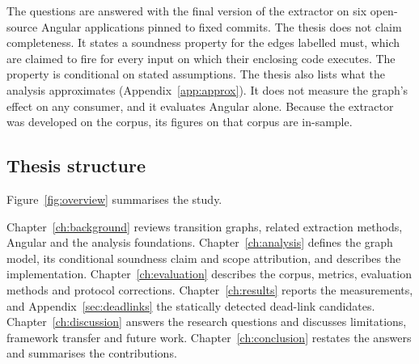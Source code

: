 The questions are answered with the final version of the extractor on six open-source Angular
applications pinned to fixed commits. The thesis does not claim
completeness. It states a soundness property for the edges labelled must, which are claimed to
fire for every input on which their enclosing code executes. The property is conditional on stated
assumptions. The thesis also lists what the analysis approximates
(Appendix~\ref{app:approx}). It does not measure the graph's effect on any consumer, and it
evaluates Angular alone. Because the extractor was developed on the corpus, its figures on that
corpus are in-sample.

\subsection{Thesis structure}

Figure~\ref{fig:overview} summarises the study.



Chapter~\ref{ch:background} reviews transition graphs, related extraction methods, Angular and
the analysis foundations. Chapter~\ref{ch:analysis} defines the graph model, its conditional
soundness claim and scope attribution, and describes the implementation. Chapter~\ref{ch:evaluation} describes the corpus,
metrics, evaluation methods and protocol corrections. Chapter~\ref{ch:results} reports the measurements, and
Appendix~\ref{sec:deadlinks} the statically detected dead-link candidates. Chapter~\ref{ch:discussion} answers the research
questions and discusses limitations, framework transfer and future work.
Chapter~\ref{ch:conclusion} restates the answers and summarises the contributions.
